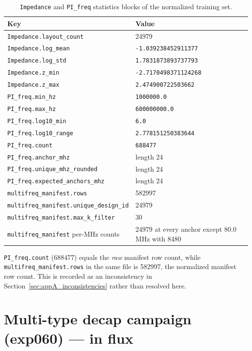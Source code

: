 \begin{table}[htbp]
\centering
\caption{\texttt{Impedance} and \texttt{PI\_freq} statistics blocks of the normalized training set.}
\label{tab:appA_imp_freq_stats}
\begin{tabular}{p{} p{}}
\hline
Key & Value \\
\hline
\texttt{Impedance.layout\_count} & 24979 \\
\texttt{Impedance.log\_mean} & \texttt{-1.039238452911377} \\
\texttt{Impedance.log\_std} & \texttt{1.7831873893737793} \\
\texttt{Impedance.z\_min} & \texttt{-2.7170498371124268} \\
\texttt{Impedance.z\_max} & \texttt{2.474900722503662} \\
\texttt{PI\_freq.min\_hz} & \texttt{1000000.0} \\
\texttt{PI\_freq.max\_hz} & \texttt{600000000.0} \\
\texttt{PI\_freq.log10\_min} & \texttt{6.0} \\
\texttt{PI\_freq.log10\_range} & \texttt{2.778151250383644} \\
\texttt{PI\_freq.count} & \texttt{688477} \\
\texttt{PI\_freq.anchor\_mhz} & length 24 \\
\texttt{PI\_freq.unique\_mhz\_rounded} & length 24 \\
\texttt{PI\_freq.expected\_anchors\_mhz} & length 24 \\
\texttt{multifreq\_manifest.rows} & 582997 \\
\texttt{multifreq\_\allowbreak{}manifest.unique\_\allowbreak{}design\_\allowbreak{}id} & 24979 \\
\texttt{multifreq\_\allowbreak{}manifest.max\_\allowbreak{}k\_\allowbreak{}filter} & 30 \\
\texttt{multifreq\_manifest} per-MHz counts & 24979 at every anchor except 80.0\,MHz with 8480 \\
\hline
\end{tabular}
\end{table}

\texttt{PI\_freq.count} (688477) equals the \emph{raw} manifest row count, while
\texttt{multifreq\_manifest.rows} in the same file is 582997, the normalized manifest row count.
This is recorded as an inconsistency in Section~\ref{sec:appA_inconsistencies} rather than resolved
here.

\section{Multi-type decap campaign (exp060) --- in flux}
\label{sec:appA_multitype}

